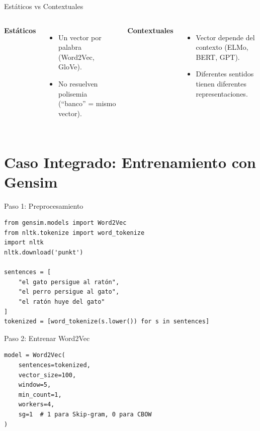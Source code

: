 \documentclass[aspectratio=169, 10pt, xcolor=table]{beamer}
\begin{document}
\begin{frame}{Estáticos vs Contextuales}
    \begin{columns}[t]
        \textbf{Estáticos}
        \begin{itemize}
            \item Un vector por palabra (Word2Vec, GloVe).
            \item No resuelven polisemia (``banco'' = mismo vector).
        \end{itemize}
        \textbf{Contextuales}
        \begin{itemize}
            \item Vector depende del contexto (ELMo, BERT, GPT).
            \item Diferentes sentidos tienen diferentes representaciones.
        \end{itemize}
    \end{columns}
\end{frame}

\section{Caso Integrado: Entrenamiento con Gensim}

\begin{frame}[fragile]{Paso 1: Preprocesamiento}
    \begin{lstlisting}
from gensim.models import Word2Vec
from nltk.tokenize import word_tokenize
import nltk
nltk.download('punkt')

sentences = [
    "el gato persigue al ratón",
    "el perro persigue al gato",
    "el ratón huye del gato"
]
tokenized = [word_tokenize(s.lower()) for s in sentences]
    \end{lstlisting}
\end{frame}

\begin{frame}[fragile]{Paso 2: Entrenar Word2Vec}
    \begin{lstlisting}
model = Word2Vec(
    sentences=tokenized,
    vector_size=100,
    window=5,
    min_count=1,
    workers=4,
    sg=1  # 1 para Skip-gram, 0 para CBOW
)
    \end{lstlisting}
\end{frame}
\end{document}
